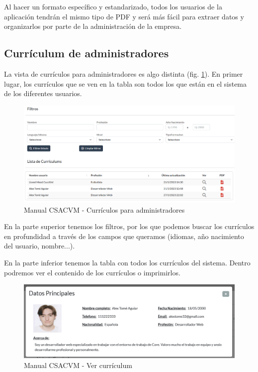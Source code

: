 Al hacer un formato específico y estandarizado, todos los usuarios de la aplicación tendrán el mismo tipo de PDF y será más fácil para extraer datos y organizarlos por parte de la administración de la empresa.

\subsection{Currículum de administradores}
La vista de currículos para administradores es algo distinta (fig. \ref{manualCNA}). En primer lugar, los currículos que se ven en la tabla son todos los que están en el sistema de los diferentes usuarios.

\begin{figure}
    \centering
    \includegraphics[width=\linewidth]{img/ManualUsuario/Manual19.png}
    \caption{Manual CSACVM - Currículos para administradores}
    \label{manualCNA}
\end{figure}
En la parte superior tenemos los filtros, por los que podemos buscar los currículos en profundidad a través de los campos que queramos (idiomas, año nacimiento del usuario, nombre...). 

En la parte inferior tenemos la tabla con todos los currículos del sistema. Dentro podremos ver el contenido de los currículos o imprimirlos.

\begin{figure}
    \centering
    \includegraphics[width=\linewidth]{img/ManualUsuario/Manual20.png}
    \caption{Manual CSACVM - Ver currículum}  
\end{figure}

